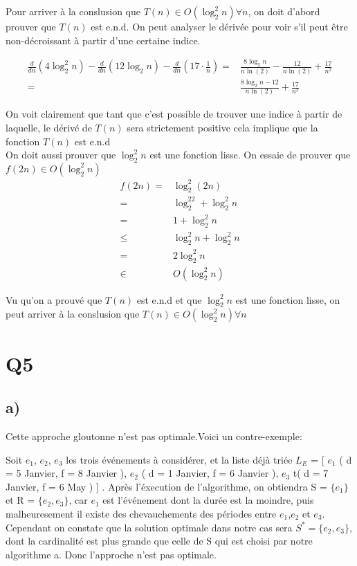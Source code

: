 \documentclass[10pt,a4paper]{article}
\begin{document}
Pour arriver à la conslusion que $T(n) \in O(\log_2^2 n) \forall n$, on doit d'abord prouver que $T(n)$ est e.n.d. On peut analyser le dérivée pour voir s'il peut être non-décroissant à partir d'une certaine indice.

\begin{align*}
    \frac{d}{dn} \left(4\log_2^2n \right) - \frac{d}{dn} \left(12\log_2n\right) - \frac{d}{dn} \left(17 \cdot \frac{1}{n}\right) =& \frac{8\log_2n}{n \ln(2)} - \frac{12}{n \ln(2)} + \frac{17}{n^2} \\
    =& \frac{8\log_2n-12}{n\ln(2)} + \frac{17}{n^2} 
\end{align*}

On voit clairement que tant que c'est possible de trouver une indice à partir de laquelle, le dérivé de $T(n)$ sera strictement positive cela implique que la fonction $T(n)$ est e.n.d \\

On doit aussi prouver que $\log_2^2n$ est une fonction lisse. On essaie de prouver que $f(2n) \in O(\log_2^2 n)$
\begin{align*}
    f(2n) =& \log_2^2 (2n) \\
    =& \log_2^22 + \log_2^2 n \\
    =& 1 + \log_2^2 n \\
    \leq& \log_2^2 n + \log_2^2 n \\
    =& 2\log_2^2n\\
    \in& O(\log_2^2 n)
\end{align*}

Vu qu'on a prouvé que $T(n)$ est e.n.d et que $\log_2^2n$ est une fonction lisse, on peut arriver à la conslusion que $T(n) \in O(\log_2^2n) \forall n$

\newpage

\section{Q5}
\subsection{a)}
Cette approche gloutonne n'est pas optimale.Voici un contre-exemple: 


Soit $e_1$, $e_2$, $e_3$ les trois événements à considérer, et la liste déjà triée $L_{E}$ = [ $e_1$  ( d = 5 Janvier, f = 8 Janvier ), $e_2$  ( d = 1 Janvier, f = 6 Janvier ), $e_3$  t( d = 7 Janvier, f = 6 May )    ] . Après l'éxecution de l'algorithme, on obtiendra S = $\{e_1\} $ et R = $\{e_2,e_3\} $, car $e_1$ est l'événement dont la durée est la moindre, puis malheuresement il existe des chevauchements des périodes entre $e_1$,$e_2$ et $e_3$. Cependant on constate que la solution optimale dans notre cas sera $S^{*} = \{e_2,e_3\} $, dont la cardinalité est plus grande que celle de S qui est choisi par notre algorithme a. Donc l'approche n'est pas optimale.
\end{document}
